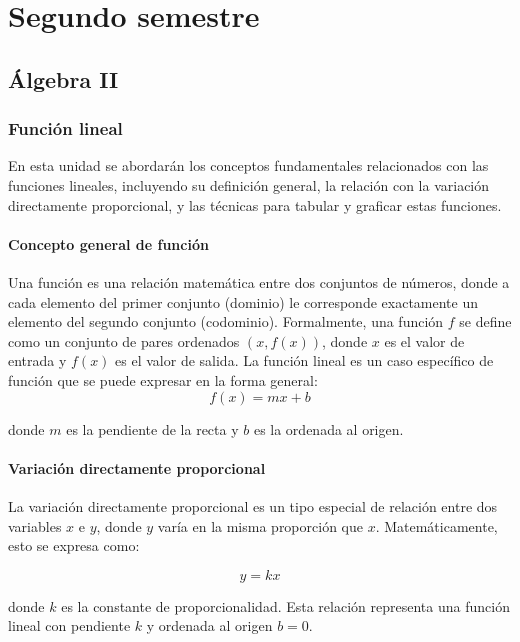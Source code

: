 \part{Segundo semestre}
\chapter{Álgebra II}


\section{Función lineal} %
En esta unidad se abordarán los conceptos fundamentales relacionados con las funciones lineales, incluyendo su definición general, la relación con la variación directamente proporcional, y las técnicas para tabular y graficar estas funciones.

\subsection{Concepto general de función}

Una función es una relación matemática entre dos conjuntos de números, donde a cada elemento del primer conjunto (dominio) le corresponde exactamente un elemento del segundo conjunto (codominio). Formalmente, una función \( f \) se define como un conjunto de pares ordenados \((x, f(x))\), donde \(x\) es el valor de entrada y \(f(x)\) es el valor de salida. La función lineal es un caso específico de función que se puede expresar en la forma general:
\begin{equation}
    f(x) = mx + b
\end{equation}

donde \(m\) es la pendiente de la recta y \(b\) es la ordenada al origen.

\subsection{Variación directamente proporcional}

La variación directamente proporcional es un tipo especial de relación entre dos variables \(x\) e \(y\), donde \(y\) varía en la misma proporción que \(x\). Matemáticamente, esto se expresa como:

\[
y = kx
\]

donde \(k\) es la constante de proporcionalidad. Esta relación representa una función lineal con pendiente \(k\) y ordenada al origen \(b = 0\).

